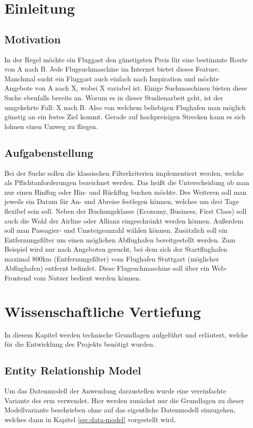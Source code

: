 \documentclass[12pt,twoside,a4paper]{article}
\begin{document}
\begin{sloppypar}
\section{Einleitung}
\subsection{Motivation}
In der Regel möchte ein Fluggast den günstigsten Preis für eine bestimmte Route von A nach B. Jede Flugsuchmaschine im Internet bietet dieses Feature. Manchmal sucht ein Fluggast auch einfach nach Inspiration und möchte Angebote von A nach X, wobei X variabel ist. Einige Suchmaschinen bieten diese Suche ebenfalls bereits an. Worum es in dieser Studienarbeit geht, ist der umgekehrte Fall: X nach B. Also von welchem beliebigen Flughafen man möglich günstig an ein festes Ziel kommt. Gerade auf hochpreisigen Strecken kann es sich lohnen einen Umweg zu fliegen.
\subsection{Aufgabenstellung}\label{sec:requirements}
Bei der Suche sollen die klassischen Filterkriterien implementiert werden, welche als Pflichtanforderungen bezeichnet werden. Das heißt die Unterscheidung ob man nur einen Hinflug oder Hin- und Rückflug buchen möchte. Des Weiteren soll man jeweils ein Datum für An- und Abreise festlegen können, welches um drei Tage flexibel sein soll. Neben der Buchungsklasse (Economy, Business, First Class) soll auch die Wahl der Airline oder Allianz eingeschränkt werden können. Außerdem soll man Passagier- und Umsteigeanzahl wählen können.\newline
Zusätzlich soll ein Entfernungsfilter um einen möglichen Abflughafen bereitgestellt werden. Zum Beispiel wird nur nach Angeboten gesucht, bei dem sich der Startflughafen maximal 800km (Entfernungsfilter) vom Flughafen Stuttgart (möglicher Abflughafen) entfernt befindet.\newline
Diese Flugsuchmaschine soll über ein Web-Frontend vom Nutzer bedient werden können.
\newpage
\section{Wissenschaftliche Vertiefung}
In diesem Kapitel werden technische Grundlagen aufgeführt und erläutert, welche für die Entwicklung des Projekts benötigt wurden.
\subsection{Entity Relationship Model}
Um das Datenmodell der Anwendung darzustellen wurde eine vereinfachte Variante des \acrfull{erm} verwendet. Hier werden zunächst nur die Grundlagen zu dieser Modellvariante beschrieben ohne auf das eigentliche Datenmodell einzugehen, welches dann in Kapitel \ref{sec:data-model} vorgestellt wird.

\end{sloppypar}
\end{document}
